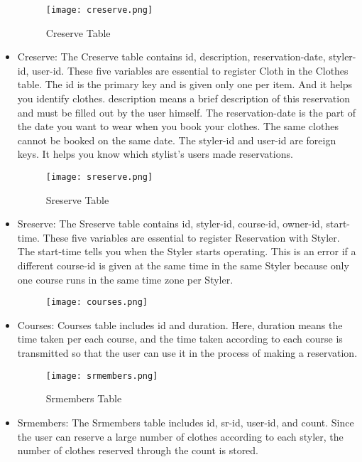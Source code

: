 \documentclass[conference]{IEEEtran}
\begin{document}
\begin{itemize}
    \begin{figure}[htbp]
    \centerline{\texttt{[image: creserve.png]}}
    \label{fig}
    \caption{Creserve Table}
    \end{figure}
    \item Creserve: The Creserve table contains id, description, reservation-date, styler-id, user-id. These five variables are essential to register Cloth in the Clothes table. The id is the primary key and is given only one per item. And it helps you identify clothes. description means a brief description of this reservation and must be filled out by the user himself. The reservation-date is the part of the date you want to wear when you book your clothes. The same clothes cannot be booked on the same date. The styler-id and user-id are foreign keys. It helps you know which stylist's users made reservations.\\
    
    \begin{figure}[htbp]
    \centerline{\texttt{[image: sreserve.png]}}
    \label{fig}
    \caption{Sreserve Table}
    \end{figure}
    \item Sreserve: The Sreserve table contains id, styler-id, course-id, owner-id, start-time. These five variables are essential to register Reservation with Styler. The start-time tells you when the Styler starts operating. This is an error if a different course-id is given at the same time in the same Styler because only one course runs in the same time zone per Styler.\\
    
    \begin{figure}[htbp]
    \centerline{\texttt{[image: courses.png]}}
    \label{fig}
    \end{figure}
    \item Courses: Courses table includes id and duration. Here, duration means the time taken per each course, and the time taken according to each course is transmitted so that the user can use it in the process of making a reservation.\\
    
    \begin{figure}[htbp]
    \centerline{\texttt{[image: srmembers.png]}}
    \label{fig}
    \caption{Srmembers Table}
    \end{figure}
    \item Srmembers: The Srmembers table includes id, sr-id, user-id, and count. Since the user can reserve a large number of clothes according to each styler, the number of clothes reserved through the count is stored.\\
\end{itemize}
\end{document}
